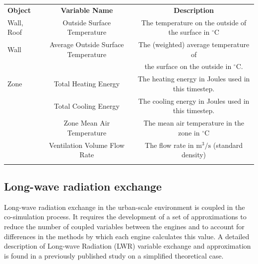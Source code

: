 \documentclass{tBPS2e}
\theoremstyle{plain}
\theoremstyle{definition}
\theoremstyle{remark}
\begin{document}
\begin{table}[H]
{\begin{tabular}[l]{@{}lcc}\toprule
  \bf{Object} &  \bf{Variable Name} & \bf{Description} \\
\colrule
Wall, Roof & Outside Surface Temperature & The temperature on the outside of the surface in $^{\circ}\mathrm{C}$ \\    
    \hline
Wall & Average Outside Surface Temperature & The (weighted) average temperature of \\
& & the surface on the outside in $^{\circ}\mathrm{C}$. \\
    \hline
Zone & Total Heating Energy & The heating energy in Joules used in this timestep. \\
& Total Cooling Energy & The cooling energy in Joules used in this timestep. \\
& Zone Mean Air Temperature & The mean air temperature in the zone in $^{\circ}\mathrm{C}$ \\
& Ventilation Volume Flow Rate & The flow rate in $\mathrm{m}^3/\mathrm{s}$ (standard density) \\
\botrule
\end{tabular}}
\label{FMUexports}
\end{table}

\subsection{Long-wave radiation exchange}
\label{lwradiation}
Long-wave radiation exchange in the urban-scale environment is coupled in the
co-simulation process. It requires the development of a set of
approximations to reduce the number of coupled variables between the engines
and to account for differences in the methods by which each engine calculates
this value. A detailed description of Long-wave Radiation (LWR) variable
exchange and approximation is found in a previously published study
\citep{miller_long_2015} on a simplified theoretical case.
\end{document}
